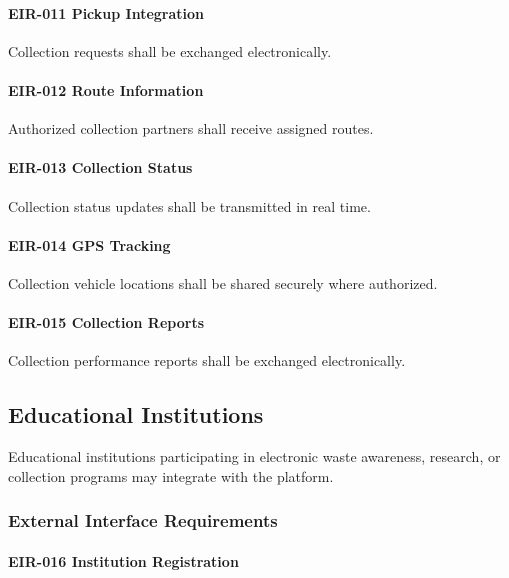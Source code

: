 \paragraph{EIR-011 Pickup Integration}

Collection requests shall be exchanged electronically.

\paragraph{EIR-012 Route Information}

Authorized collection partners shall receive assigned routes.

\paragraph{EIR-013 Collection Status}

Collection status updates shall be transmitted in real time.

\paragraph{EIR-014 GPS Tracking}

Collection vehicle locations shall be shared securely where authorized.

\paragraph{EIR-015 Collection Reports}

Collection performance reports shall be exchanged electronically.


\subsection{Educational Institutions}

Educational institutions participating in electronic waste awareness,
research, or collection programs may integrate with the platform.


\subsubsection*{External Interface Requirements}

\paragraph{EIR-016 Institution Registration}

